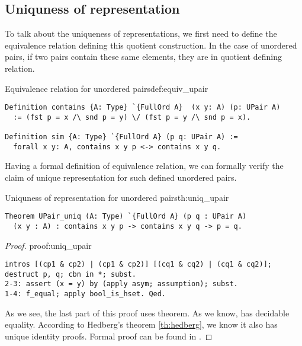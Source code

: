 \subsection{Uniquness of representation}
To talk about the uniqueness of representations, we first need to define the equivalence relation defining this quotient construction. In the case of unordered pairs, if two pairs contain these same elements, they are in quotient defining relation.
\begin{defi}{Equivalence relation for unordered pairs}{def:equiv_upair}
\begin{verbatim}
Definition contains {A: Type} `{FullOrd A}  (x y: A) (p: UPair A) 
  := (fst p = x /\ snd p = y) \/ (fst p = y /\ snd p = x).

Definition sim {A: Type} `{FullOrd A} (p q: UPair A) :=
  forall x y: A, contains x y p <-> contains x y q. 
\end{verbatim}
\end{defi}
Having a formal definition of equivalence relation, we can formally verify the claim of unique representation for such defined unordered pairs.
\begin{theo}{Uniquness of representation for unordered pairs}{th:uniq_upair}
\begin{verbatim}
Theorem UPair_uniq (A: Type) `{FullOrd A} (p q : UPair A) 
  (x y : A) : contains x y p -> contains x y q -> p = q.
\end{verbatim}
\end{theo}
\begin{proof}{}{proof:uniq_upair}
\begin{verbatim}
intros [(cp1 & cp2) | (cp1 & cp2)] [(cq1 & cq2) | (cq1 & cq2)];
destruct p, q; cbn in *; subst.
2-3: assert (x = y) by (apply asym; assumption); subst.
1-4: f_equal; apply bool_is_hset. Qed.
\end{verbatim}
As we see, the last part of this proof uses  theorem. As we know,  has decidable equality. According to Hedberg's theorem \ref{th:hedberg}, we know it also has unique identity proofs. Formal proof can be found in .
\end{proof}
